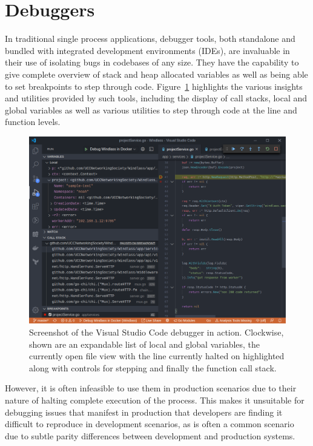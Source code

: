 \documentclass[12pt,pdftex,titlepage]{report}
\begin{document}
        \section{Debuggers}
            In traditional single process applications, debugger tools, both standalone and bundled with integrated development environments (IDEs), are invaluable in their
            use of isolating bugs in codebases of any size. They have the capability to give complete overview of stack and heap allocated variables as well as being able to set
            breakpoints to step through code. Figure~\ref{fig:debugger} highlights the various insights and utilities provided by such tools, including the display of call stacks,
            local and global variables as well as various utilities to step through code at the line and function levels.

            \begin{figure}[hbt!]
                \centering
                \includegraphics[scale=0.335]{debugger}
                \caption{Screenshot of the Visual Studio Code debugger in action. Clockwise, shown are an expandable list of local and global variables, the currently open file view
                with the line currently halted on highlighted along with controls for stepping and finally the function call stack.}
                \label{fig:debugger}
            \end{figure}
            
            However, it is often infeasible to use them in production scenarios due to their nature of halting complete execution of the process.
            This makes it unsuitable for debugging issues that manifest in production that developers are finding it difficult to reproduce in development scenarios, as is often
            a common scenario due to subtle parity differences between development and production systems.
\end{document}
